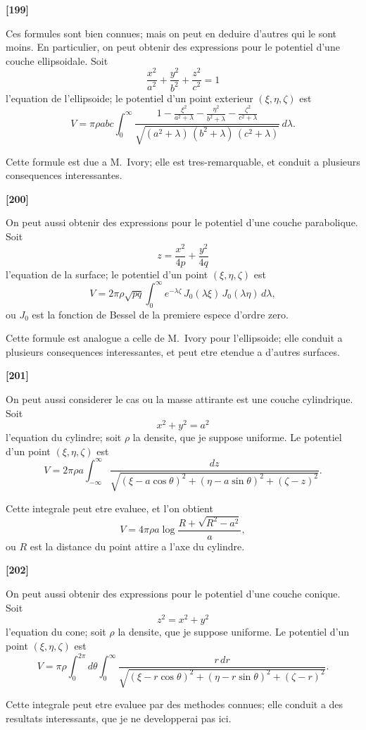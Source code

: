 \documentclass[11pt,a4paper]{article}
\begin{document}
\textbf{[199]}

Ces formules sont bien connues; mais on peut en deduire d'autres qui le sont
moins. En particulier, on peut obtenir des expressions pour le potentiel d'une couche
ellipsoidale. Soit
\[\frac{x^2}{a^2} + \frac{y^2}{b^2} + \frac{z^2}{c^2} = 1\]
l'equation de l'ellipsoide; le potentiel d'un point exterieur $(\xi, \eta, \zeta)$ est
\[V = \pi\rho a b c \int_0^{\infty} \frac{1 - \frac{\xi^2}{a^2 + \lambda} - \frac{\eta^2}{b^2 + \lambda} - \frac{\zeta^2}{c^2 + \lambda}}{\sqrt{(a^2 + \lambda)\, (b^2 + \lambda)\, (c^2 + \lambda)}}\, d\lambda.\]

Cette formule est due a M.~Ivory; elle est tres-remarquable, et conduit a plusieurs
consequences interessantes.

\textbf{[200]}

On peut aussi obtenir des expressions pour le potentiel d'une couche parabolique.
Soit
\[z = \frac{x^2}{4p} + \frac{y^2}{4q}\]
l'equation de la surface; le potentiel d'un point $(\xi, \eta, \zeta)$ est
\[V = 2\pi\rho \sqrt{pq} \int_0^{\infty} e^{-\lambda\zeta}\, J_0(\lambda\xi)\, J_0(\lambda\eta)\, d\lambda,\]
ou $J_0$ est la fonction de Bessel de la premiere espece d'ordre zero.

Cette formule est analogue a celle de M.~Ivory pour l'ellipsoide; elle conduit a
plusieurs consequences interessantes, et peut etre etendue a d'autres surfaces.

\textbf{[201]}

On peut aussi considerer le cas ou la masse attirante est une couche cylindrique.
Soit
\[x^2 + y^2 = a^2\]
l'equation du cylindre; soit $\rho$ la densite, que je suppose uniforme. Le potentiel d'un
point $(\xi, \eta, \zeta)$ est
\[V = 2\pi\rho a \int_{-\infty}^{\infty} \frac{dz}{\sqrt{(\xi - a\cos\theta)^2 + (\eta - a\sin\theta)^2 + (\zeta - z)^2}}.\]

Cette integrale peut etre evaluee, et l'on obtient
\[V = 4\pi\rho a \log \frac{R + \sqrt{R^2 - a^2}}{a},\]
ou $R$ est la distance du point attire a l'axe du cylindre.

\textbf{[202]}

On peut aussi obtenir des expressions pour le potentiel d'une couche conique.
Soit
\[z^2 = x^2 + y^2\]
l'equation du cone; soit $\rho$ la densite, que je suppose uniforme. Le potentiel d'un point
$(\xi, \eta, \zeta)$ est
\[V = \pi\rho \int_0^{2\pi} d\theta \int_0^{\infty} \frac{r\, dr}{\sqrt{(\xi - r\cos\theta)^2 + (\eta - r\sin\theta)^2 + (\zeta - r)^2}}.\]

Cette integrale peut etre evaluee par des methodes connues; elle conduit a des
resultats interessants, que je ne developperai pas ici.
\end{document}
